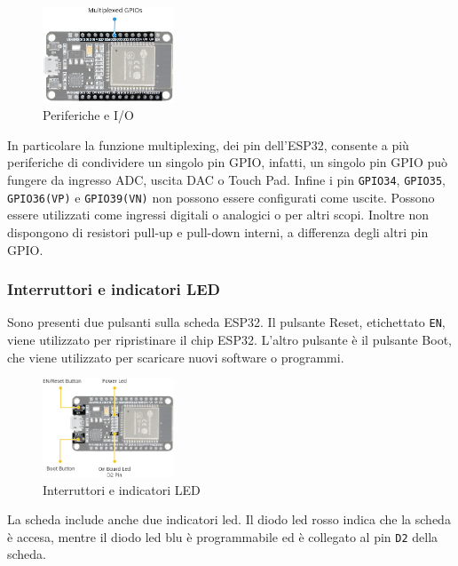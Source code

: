 \documentclass[a4paper,12pt]{report}  %
\newcommand{\lstinlinebg}[1]{\colorbox{backcolour}{\lstinline|#1|}}
\begin{document}
\begin{figure}[h]
    \centering
    \includegraphics[width=0.35\textwidth]{imgs/ESP32-Hardware-Specifications-Multiplexed-GPIO-pins.jpg}
    \caption{Periferiche e I/O}
    \label{fig:ESP32-I/O}
\end{figure}

In particolare la funzione multiplexing, dei pin dell'ESP32, consente a più periferiche di condividere un singolo pin GPIO, infatti, un singolo pin GPIO può fungere da ingresso ADC, uscita DAC o Touch Pad.
Infine i pin \lstinlinebg{GPIO34}, \lstinlinebg{GPIO35}, \lstinlinebg{GPIO36(VP)} e \lstinlinebg{GPIO39(VN)} non possono essere conﬁgurati come uscite.
Possono essere utilizzati come ingressi digitali o analogici o per altri scopi.
Inoltre non dispongono di resistori pull-up e pull-down interni, a diﬀerenza degli altri pin GPIO.

\subsubsection{Interruttori e indicatori LED}
Sono presenti due pulsanti sulla scheda ESP32.
Il pulsante Reset, etichettato \lstinlinebg{EN}, viene utilizzato per ripristinare il chip ESP32.
L'altro pulsante è il pulsante Boot, che viene utilizzato per scaricare nuovi software o programmi.

\begin{figure}[h]
    \centering
    \includegraphics[width=0.35\textwidth]{imgs/ESP32-Hardware-Specifications-Reset-Boot-Buttons-LED-Indicators.jpg}
    \caption{Interruttori e indicatori LED}
    \label{fig:ESP32-LED}
\end{figure}

La scheda include anche due indicatori led. Il diodo led rosso indica che la scheda è accesa, mentre il diodo led blu è programmabile ed è collegato al pin \lstinlinebg{D2} della scheda.
\end{document}
